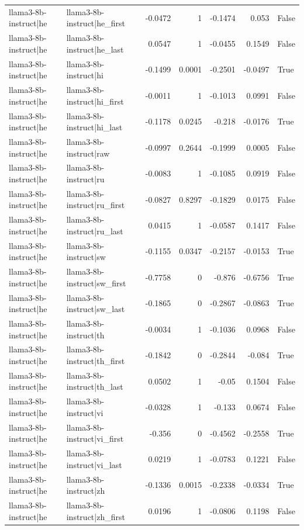 \begin{table}
\begin{tabular}{l l r r r r l}
llama3-8b-instruct|he & llama3-8b-instruct|he_first & -0.0472 & 1 & -0.1474 & 0.053 & False \\
llama3-8b-instruct|he & llama3-8b-instruct|he_last & 0.0547 & 1 & -0.0455 & 0.1549 & False \\
llama3-8b-instruct|he & llama3-8b-instruct|hi & -0.1499 & 0.0001 & -0.2501 & -0.0497 & True \\
llama3-8b-instruct|he & llama3-8b-instruct|hi_first & -0.0011 & 1 & -0.1013 & 0.0991 & False \\
llama3-8b-instruct|he & llama3-8b-instruct|hi_last & -0.1178 & 0.0245 & -0.218 & -0.0176 & True \\
llama3-8b-instruct|he & llama3-8b-instruct|raw & -0.0997 & 0.2644 & -0.1999 & 0.0005 & False \\
llama3-8b-instruct|he & llama3-8b-instruct|ru & -0.0083 & 1 & -0.1085 & 0.0919 & False \\
llama3-8b-instruct|he & llama3-8b-instruct|ru_first & -0.0827 & 0.8297 & -0.1829 & 0.0175 & False \\
llama3-8b-instruct|he & llama3-8b-instruct|ru_last & 0.0415 & 1 & -0.0587 & 0.1417 & False \\
llama3-8b-instruct|he & llama3-8b-instruct|sw & -0.1155 & 0.0347 & -0.2157 & -0.0153 & True \\
llama3-8b-instruct|he & llama3-8b-instruct|sw_first & -0.7758 & 0 & -0.876 & -0.6756 & True \\
llama3-8b-instruct|he & llama3-8b-instruct|sw_last & -0.1865 & 0 & -0.2867 & -0.0863 & True \\
llama3-8b-instruct|he & llama3-8b-instruct|th & -0.0034 & 1 & -0.1036 & 0.0968 & False \\
llama3-8b-instruct|he & llama3-8b-instruct|th_first & -0.1842 & 0 & -0.2844 & -0.084 & True \\
llama3-8b-instruct|he & llama3-8b-instruct|th_last & 0.0502 & 1 & -0.05 & 0.1504 & False \\
llama3-8b-instruct|he & llama3-8b-instruct|vi & -0.0328 & 1 & -0.133 & 0.0674 & False \\
llama3-8b-instruct|he & llama3-8b-instruct|vi_first & -0.356 & 0 & -0.4562 & -0.2558 & True \\
llama3-8b-instruct|he & llama3-8b-instruct|vi_last & 0.0219 & 1 & -0.0783 & 0.1221 & False \\
llama3-8b-instruct|he & llama3-8b-instruct|zh & -0.1336 & 0.0015 & -0.2338 & -0.0334 & True \\
llama3-8b-instruct|he & llama3-8b-instruct|zh_first & 0.0196 & 1 & -0.0806 & 0.1198 & False \\

\end{tabular}
\end{table}
